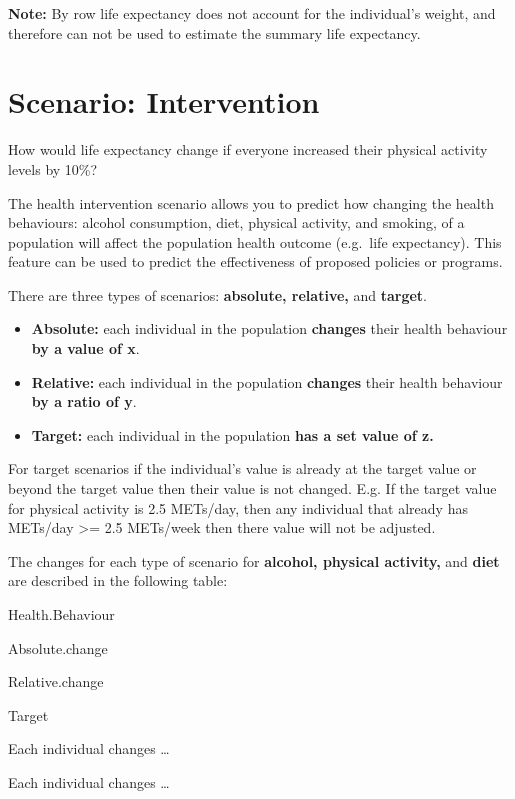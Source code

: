 \documentclass[]{book}
\providecommand{\tightlist}{%
  \setlength{\itemsep}{0pt}\setlength{\parskip}{0pt}}
\begin{document}
\textbf{Note:} By row life expectancy does not account for the
individual's weight, and therefore can not be used to estimate the
summary life expectancy.

\section{Scenario: Intervention}\label{scenario-intervention}

How would life expectancy change if everyone increased their physical
activity levels by 10\%?

The health intervention scenario allows you to predict how changing the
health behaviours: alcohol consumption, diet, physical activity, and
smoking, of a population will affect the population health outcome
(e.g.~life expectancy). This feature can be used to predict the
effectiveness of proposed policies or programs.

There are three types of scenarios: \textbf{absolute, relative,} and
\textbf{target}.

\begin{itemize}
\tightlist
\item
  \textbf{Absolute:} each individual in the population \textbf{changes}
  their health behaviour \textbf{by a value of x}.
\item
  \textbf{Relative:} each individual in the population \textbf{changes}
  their health behaviour \textbf{by a ratio of y}.
\item
  \textbf{Target:} each individual in the population \textbf{has a set
  value of z.}
\end{itemize}

For target scenarios if the individual's value is already at the target
value or beyond the target value then their value is not changed. E.g.
If the target value for physical activity is 2.5 METs/day, then any
individual that already has METs/day \textgreater{}= 2.5 METs/week then
there value will not be adjusted.

The changes for each type of scenario for \textbf{alcohol, physical
activity,} and \textbf{diet} are described in the following table:

Health.Behaviour

Absolute.change

Relative.change

Target

Each individual changes \ldots{}

Each individual changes \ldots{}
\end{document}
